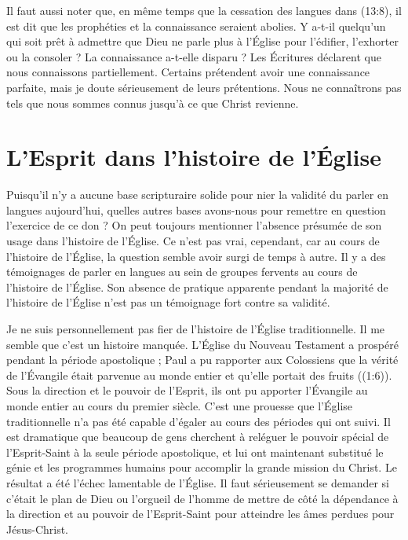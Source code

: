 Il faut aussi noter que, en même temps que la cessation des langues
 dans (13:8), il est dit que les prophéties et la
 connaissance seraient abolies. Y a-t-il quelqu'un qui soit prêt à admettre
 que Dieu ne parle plus à l'Église pour l'édifier, l'exhorter ou la consoler ?
 La connaissance a-t-elle disparu ? Les Écritures déclarent que nous
 connaissons partiellement. Certains prétendent avoir une connaissance
 parfaite, mais je doute sérieusement de leurs prétentions.
 Nous ne connaîtrons pas tels que nous sommes connus jusqu'à ce que Christ
 revienne.


\section*{L'Esprit dans l'histoire de l'Église}

Puisqu'il n'y a aucune base scripturaire solide pour nier la validité
 du parler en langues aujourd'hui, quelles autres bases avons-nous
 pour remettre en question l'exercice de ce don ? On peut toujours mentionner
 l'absence présumée de son usage dans l'histoire de l'Église.
 Ce n'est pas vrai, cependant, car au cours de l'histoire de l'Église,
 la question semble avoir surgi de temps à autre.
 Il y a des témoignages de parler en langues au sein de groupes fervents
 au cours de l'histoire de l'Église. Son absence de pratique apparente
 pendant la majorité de l'histoire de l'Église n'est pas un témoignage
 fort contre sa validité.

Je ne suis personnellement pas fier de l'histoire de l'Église traditionnelle.
 Il me semble que c'est un histoire manquée. L'Église du Nouveau Testament
 a prospéré pendant la période apostolique ; Paul a pu rapporter aux
 Colossiens que la vérité de l'Évangile était parvenue au monde entier
 et qu'elle portait des fruits ((1:6)).
 Sous la direction et le pouvoir de l'Esprit, ils ont pu apporter l'Évangile
 au monde entier au cours du premier siècle. C'est une prouesse
 que l'Église traditionnelle n'a pas été capable d'égaler au cours
 des périodes qui ont suivi. Il est dramatique que beaucoup de gens
 cherchent à reléguer le pouvoir spécial de l'Esprit-Saint à la seule période
 apostolique, et lui ont maintenant substitué le génie et les programmes
 humains pour accomplir la grande mission du Christ.
 Le résultat a été l'échec lamentable de l'Église.
 Il faut sérieusement se demander si c'était le plan de Dieu ou l'orgueil
 de l'homme de mettre de côté la dépendance à la direction et au pouvoir
 de l'Esprit-Saint pour atteindre les âmes perdues pour Jésus-Christ.

